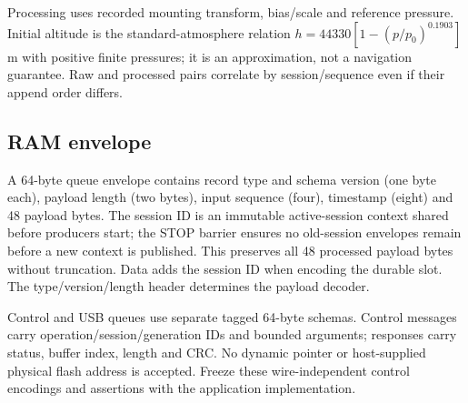 Processing uses recorded mounting transform, bias/scale and reference pressure. Initial altitude is the standard-atmosphere relation \(h=44330[1-(p/p_0)^{0.1903}]\) m with positive finite pressures; it is an approximation, not a navigation guarantee. Raw and processed pairs correlate by session/sequence even if their append order differs.

\subsection{RAM envelope}
A 64-byte queue envelope contains record type and schema version (one byte each), payload length (two bytes), input sequence (four), timestamp (eight) and 48 payload bytes. The session ID is an immutable active-session context shared before producers start; the STOP barrier ensures no old-session envelopes remain before a new context is published. This preserves all 48 processed payload bytes without truncation. Data adds the session ID when encoding the durable slot. The type/version/length header determines the payload decoder.

Control and USB queues use separate tagged 64-byte schemas. Control messages carry operation/session/generation IDs and bounded arguments; responses carry status, buffer index, length and CRC. No dynamic pointer or host-supplied physical flash address is accepted. Freeze these wire-independent control encodings and assertions with the application implementation.
